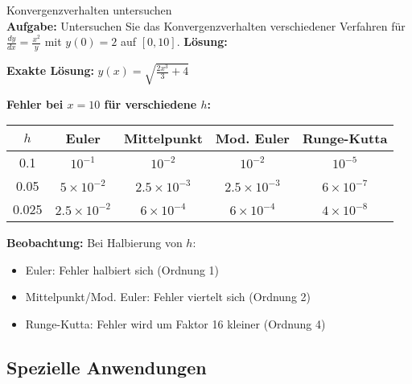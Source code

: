 \begin{example2}{Konvergenzverhalten untersuchen}\\
\textbf{Aufgabe:} Untersuchen Sie das Konvergenzverhalten verschiedener Verfahren für $\frac{dy}{dx} = \frac{x^2}{y}$ mit $y(0) = 2$ auf $[0, 10]$.
\tcblower
\textbf{Lösung:}

\textbf{Exakte Lösung:} $y(x) = \sqrt{\frac{2x^3}{3} + 4}$

\textbf{Fehler bei $x = 10$ für verschiedene $h$:}

\begin{center}
\begin{tabular}{|c|c|c|c|c|}
\hline
$h$ & Euler & Mittelpunkt & Mod. Euler & Runge-Kutta \\
\hline
0.1 & $10^{-1}$ & $10^{-2}$ & $10^{-2}$ & $10^{-5}$ \\
\hline
0.05 & $5 \times 10^{-2}$ & $2.5 \times 10^{-3}$ & $2.5 \times 10^{-3}$ & $6 \times 10^{-7}$ \\
\hline
0.025 & $2.5 \times 10^{-2}$ & $6 \times 10^{-4}$ & $6 \times 10^{-4}$ & $4 \times 10^{-8}$ \\
\hline
\end{tabular}
\end{center}

\textbf{Beobachtung:} Bei Halbierung von $h$:
\begin{itemize}
    \item Euler: Fehler halbiert sich (Ordnung 1)
    \item Mittelpunkt/Mod. Euler: Fehler viertelt sich (Ordnung 2)
    \item Runge-Kutta: Fehler wird um Faktor 16 kleiner (Ordnung 4)
\end{itemize}
\end{example2}

\subsection{Spezielle Anwendungen}

